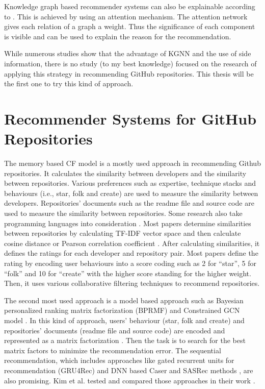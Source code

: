 \documentclass[11pt,twoside]{report}
\begin{document}
Knowledge graph based recommender systems can also be explainable according to \cite{guo_survey_2020}. This is achieved by using an attention mechanism. The attention network gives each relation of a graph a weight. Thus the significance of each component is visible and can be used to explain the reason for the recommendation.

While numerous studies show that the advantage of KGNN and the use of side information, there is no study (to my best knowledge) focused on the research of applying this strategy in recommending GitHub repositories. This thesis will be the first one to try this kind of approach.

\section{Recommender Systems for GitHub Repositories}
The memory based CF model is a mostly used approach in recommending Github repositories. It calculates the similarity between developers and the similarity between repositories. Various preferences such as expertise, technique stacks and behaviours (i.e., star, folk and create) are used to measure the similarity between developers. Repositories' documents such as the readme file and source code are used to measure the similarity between repositories. Some research also take programming languages into consideration \cite{inka_open_2018, sun_personalized_2018}. Most papers determine similarities between repositories by calculating TF-IDF vector space and then calculate cosine distance or Pearson correlation coefficient \cite{mansur_review_nodate, kim_sequential_2021}. After calculating similarities, it defines the ratings for each developer and repository pair. Most papers define the rating by encoding user behaviours into a score coding such as 2 for “star”, 5 for “folk” and 10 for “create” with the higher score standing for the higher weight. Then, it uses various collaborative filtering techniques to recommend repositories.

The second most used approach is a model based approach such as Bayesian personalized ranking matrix factorization (BPRMF) \cite{jiang_open_2017} and Constrained GCN model \cite{shao_paper2repo_2020}. In this kind of approach, users’ behaviour (star, folk and create) and repositories’ documents (readme file and source code) are encoded and represented as a matrix factorization \cite{jiang_open_2017}. Then the task is to search for the best matrix factors to minimize the recommendation error. The sequential recommendation, which includes approaches like gated recurrent units for recommendation (GRU4Rec) and DNN based Caser and SASRec methods \cite{kim_sequential_2021}, are also promising. Kim et al. \cite{kim_sequential_2021} tested and compared those approaches in their work \cite{kim_sequential_2021}.
\end{document}
